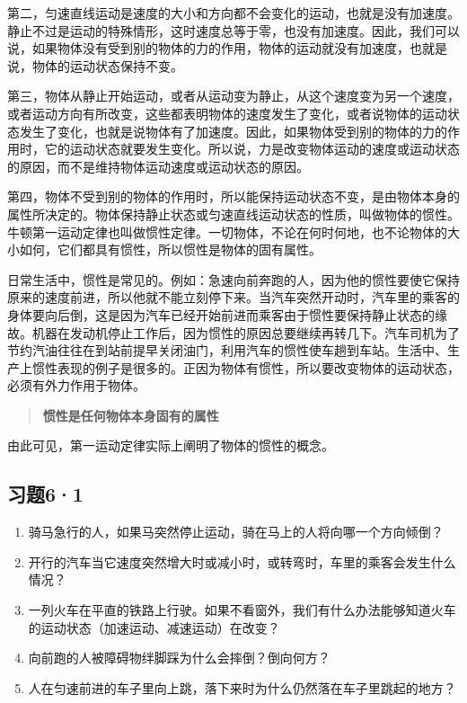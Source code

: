 第二，匀速直线运动是速度的大小和方向都不会变化的运动，也就是没有加速度。静止不过是运动的特殊情形，这时速度总等于零，也没有加速度。因此，我们可以说，如果物体没有受到别的物体的力的作用，物体的运动就没有加速度，也就是说，物体的运动状态保持不变。

第三，物体从静止开始运动，或者从运动变为静止，从这个速度变为另一个速度，或者运动方向有所改变，这些都表明物体的速度发生了变化，或者说物体的运动状态发生了变化，也就是说物体有了加速度。因此，如果物体受到别的物体的力的作用时，它的运动状态就要发生变化。所以说，力是改变物体运动的速度或运动状态的原因，而不是维持物体运动速度或运动状态的原因。

第四，物体不受到别的物体的作用时，所以能保持运动状态不变，是由物体本身的属性所决定的。物体保持静止状态或匀速直线运动状态的性质，叫做物体的惯性。牛顿第一运动定律也叫做惯性定律。一切物体，不论在何时何地，也不论物体的大小如何，它们都具有惯性，所以惯性是物体的固有属性。

日常生活中，惯性是常见的。例如：急速向前奔跑的人，因为他的惯性要使它保持原来的速度前进，所以他就不能立刻停下来。当汽车突然开动时，汽车里的乘客的身体要向后倒，这是因为汽车已经开始前进而乘客由于惯性要保持静止状态的缘故。机器在发动机停止工作后，因为惯性的原因总要继续再转几下。汽车司机为了节约汽油往往在到站前提早关闭油门，利用汽车的惯性使车趟到车站。生活中、生产上惯性表现的例子是很多的。正因为物体有惯性，所以要改变物体的运动状态，必须有外力作用于物体。

\begin{quote}
\textbf{惯性是任何物体本身固有的属性}
\end{quote}

由此可见，第一运动定律实际上阐明了物体的惯性的概念。

\subsection{习题6·1}\label{ux4e60ux989861}

\begin{enumerate}
\def\labelenumi{\arabic{enumi}.}
\item
  骑马急行的人，如果马突然停止运动，骑在马上的人将向哪一个方向倾倒？
\item
  开行的汽车当它速度突然增大时或减小时，或转弯时，车里的乘客会发生什么情况？
\item
  一列火车在平直的铁路上行驶。如果不看窗外，我们有什么办法能够知道火车的运动状态（加速运动、减速运动）在改变？
\item
  向前跑的人被障碍物绊脚踩为什么会摔倒？倒向何方？
\item
  人在匀速前进的车子里向上跳，落下来时为什么仍然落在车子里跳起的地方？
\end{enumerate}

